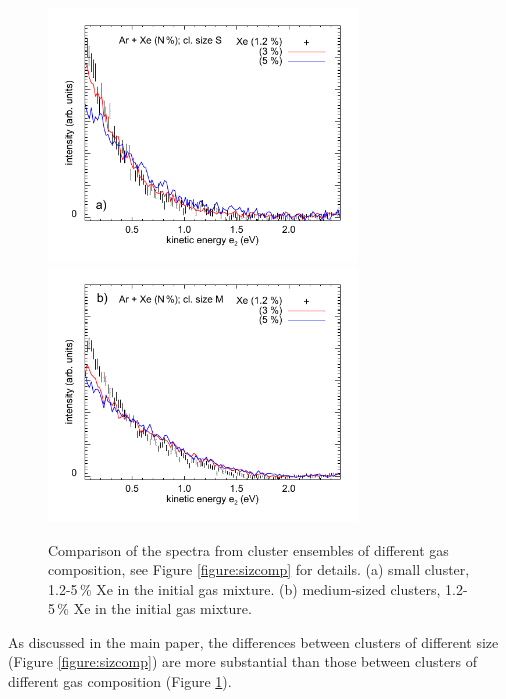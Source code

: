 \documentclass[journal=jpccck,manuscript=suppinfo]{achemso}
\begin{document}
%
%
\begin{figure}
 \centering
 \includegraphics[width=8.2cm]{pics/677_661_cs.pdf}
 \includegraphics[width=8.2cm]{pics/668_653_cs.pdf}
 \caption{
Comparison of the spectra from cluster ensembles of different gas composition, see Figure \protect\ref{figure:sizcomp} for details.
(a) small cluster, 1.2-5\,\% Xe in the initial gas mixture.
(b) medium-sized clusters, 1.2-5\,\% Xe in the initial gas mixture.
 \label{figure:compcomp}
 }
\end{figure}
%
%
As discussed in the main paper, the differences between clusters of different size (Figure \ref{figure:sizcomp}) are more substantial than those between clusters of different gas composition (Figure \ref{figure:compcomp}).



\clearpage

\clearpage

\raggedright

\end{document}
